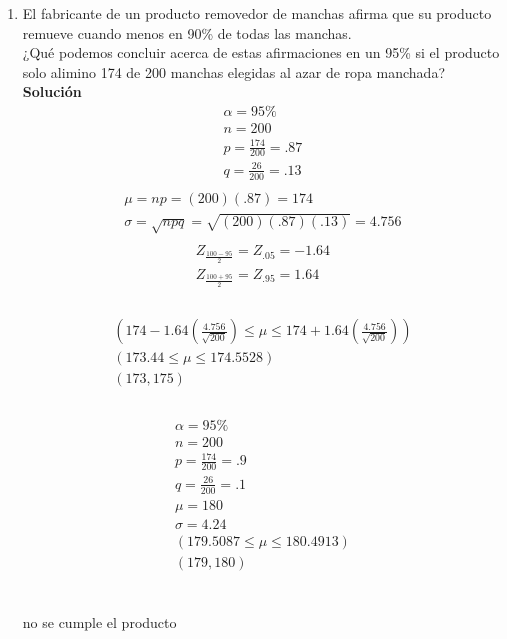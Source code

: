 \begin{enumerate}
    
    \item El fabricante de un producto removedor de manchas afirma que su producto remueve cuando menos en 90\% de todas las manchas.\\
    ¿Qué podemos concluir acerca de estas afirmaciones en un  95\% si el producto solo alimino 174 de 200 manchas elegidas al azar de ropa manchada?
    \\\textbf{Solución}
    \begin{gather*}
    \alpha = 95\%\\
    n	= 200\\
    p = \frac{174}{200} = .87\\
    q = \frac{26}{200} = .13\\
    \end{gather*}
    \begin{gather*}
    \mu = np = (200)(.87) = 174\\
    \sigma = \sqrt{npq} = \sqrt{(200)(.87)(.13)} = 4.756\\
    \end{gather*}
    \begin{gather*}	 
    Z_{\frac{100 - 95}{2}} = Z_{.05} = -1.64\\
    Z_{\frac{100 + 95}{2}} = Z_{.95} = 1.64\\
    \end{gather*}\\
    \begin{gather*}	 
    (174 - 1.64(\frac{4.756}{\sqrt{200}}) \le \mu \le 174 + 1.64(\frac{4.756}{\sqrt{200}}))\\
    (173.44 \le \mu \le 174.5528)\\
     (173,175)\\
    \end{gather*}\\
    \begin{gather*}	 
    \alpha = 95\%\\
    n	= 200\\
    p = \frac{174}{200} = .9\\
    q = \frac{26}{200} = .1\\
    \mu = 180\\
    \sigma = 4.24\\
    (179.5087 \le \mu \le 180.4913)\\
     (179,180)\\
    \end{gather*}\\
    \begin{center}
         no se cumple el producto\\
    \end{center}
    

\end{enumerate}
